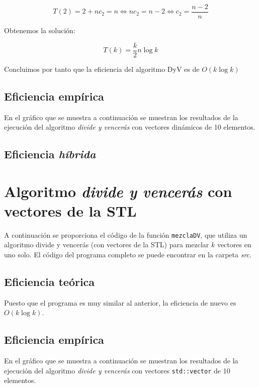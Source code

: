 \documentclass[11pt]{article}
\begin{document}
$$ T(2) = 2 + n c_2 = n \iff n c_2 = n - 2 \iff c_2 = \frac{n-2}{n}$$

Obtenemos la solución:

$$T(k) = \frac{k}{2}n\log k$$

Concluimos por tanto que la eficiencia del algoritmo DyV es de $O(k\log k)$

\subsection*{Eficiencia empírica}

En el gráfico que se muestra a continuación se muestran los resultados de la
ejecución del algoritmo \textit{divide y vencerás} con vectores dinámicos de 10 elementos.

\begin{center}
	
\end{center}

\subsection*{Eficiencia \textit{híbrida}}

\section*{Algoritmo \textit{divide y vencerás} con vectores de la STL}


A continuación se proporciona el código de la función \texttt{mezclaDV},
que utiliza un algoritmo divide y vencerás (con vectores de la STL) para mezclar $k$ vectores en uno solo. El
código del programa completo se puede encontrar en la carpeta \textit{src}.\\



\subsection*{Eficiencia teórica}

Puesto que el programa es muy similar al anterior, la eficiencia de nuevo es $O(k\log k)$.

\subsection*{Eficiencia empírica}

En el gráfico que se muestra a continuación se muestran los resultados de la
ejecución del algoritmo \textit{divide y vencerás} con vectores
\texttt{std::vector} de 10 elementos.
\end{document}
